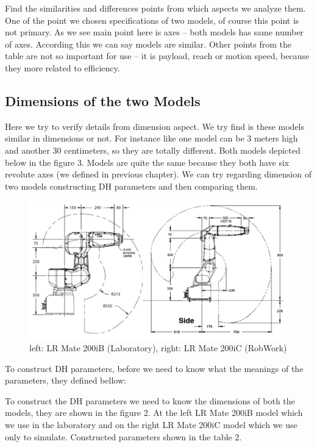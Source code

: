Find the similarities and differences points from which aspects we analyze them. One of the point we chosen specifications of two models, of course this point is not primary. As we see main point here is axes – both models has same number of axes. According this we can say models are similar. Other points from the table are not so important for use – it is payload, reach or motion speed, because they more related to efficiency.

\subsection{Dimensions of the two Models}
Here we try to verify details from dimension aspect. We try find is these models similar in dimensions or not. For instance like one model can be 3 meters high and another 30 centimeters, so they are totally different.  Both models depicted below in the figure 3. Models are quite the same because they both have six revolute axes (we defined in previous chapter). We can try regarding dimension of two models constructing DH parameters and then comparing them.

\begin{figure}[H]
  \centering
  \includegraphics[scale= 0.45]{source/ModelsDimensions.png}
  \caption{left: LR Mate 200iB (Laboratory), right: LR Mate 200iC (RobWork)}
  \label{fig:ModelsDimensions}
\end{figure}

To construct DH parameters, before we need to know what the meanings of the parameters, they defined bellow:


To construct the DH parameters we need to know the dimensions of both the models, they are shown in the figure 2. At the left LR Mate 200iB model which we use in the laboratory and on the right LR Mate 200iC model which we use only to simulate. Constructed parameters shown in the table 2. 

